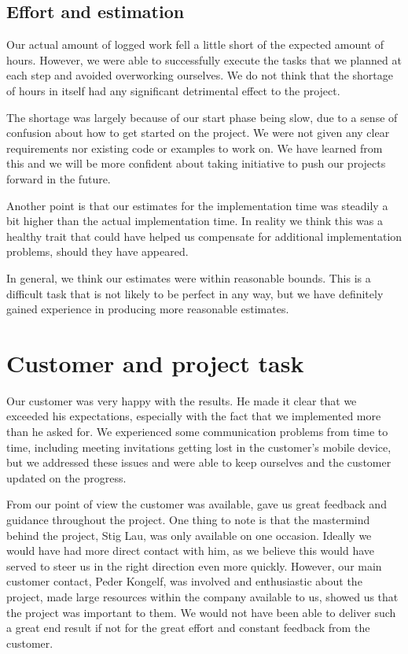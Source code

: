 \subsection*{Effort and estimation}
Our actual amount of logged work fell a little short of the expected amount of hours. However, we were able to successfully execute the tasks that we planned at each step and avoided overworking ourselves. We do not think that the shortage of hours in itself had any significant detrimental effect to the project.

The shortage was largely because of our start phase being slow, due to a sense of confusion about how to get started on the project. We were not given any clear requirements nor existing code or examples to work on. We have learned from this and we will be more confident about taking initiative to push our projects forward in the future.

Another point is that our estimates for the implementation time was steadily a bit higher than the actual implementation time. In reality we think this was a healthy trait that could have helped us compensate for additional implementation problems, should they have appeared.

In general, we think our estimates were within reasonable bounds. This is a difficult task that is not likely to be perfect in any way, but we have definitely gained experience in producing more reasonable estimates.

\section{Customer and project task}
Our customer was very happy with the results. He made it clear that we exceeded his expectations, especially with the fact that we implemented more than he asked for. We experienced some communication problems from time to time, including meeting invitations getting lost in the customer’s mobile device, but we addressed these issues and were able to keep ourselves and the customer updated on the progress.

From our point of view the customer was available, gave us great feedback and guidance throughout the project. One thing to note is that the mastermind behind the project, Stig Lau, was only available on one occasion. Ideally we would have had more direct contact with him, as we believe this would have served to steer us in the right direction even more quickly. However, our main customer contact, Peder Kongelf, was involved and enthusiastic about the project, made large resources within the company available to us, showed us that the project was important to them. We would not have been able to deliver such a great end result if not for the great effort and constant feedback from the customer. 

